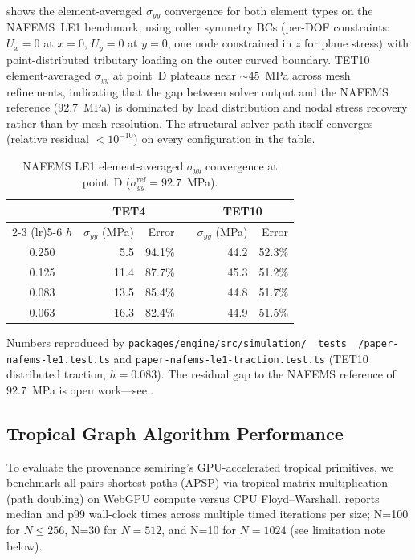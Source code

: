 \documentclass[journal]{IEEEtran}
\begin{document}
 shows the element-averaged $\sigma_{yy}$ convergence
for both element types on the NAFEMS~LE1 benchmark, using roller symmetry
BCs (per-DOF constraints: $U_x = 0$ at $x = 0$, $U_y = 0$ at $y = 0$,
one node constrained in $z$ for plane stress) with point-distributed
tributary loading on the outer curved boundary. TET10 element-averaged
$\sigma_{yy}$ at point~D plateaus near $\sim 45$~MPa across mesh
refinements, indicating that the gap between solver output and the
NAFEMS reference (92.7~MPa) is dominated by load distribution and
nodal stress recovery rather than by mesh resolution. The structural
solver path itself converges (relative residual $< 10^{-10}$) on every
configuration in the table.

\begin{table}[t]
  \centering
  \caption{NAFEMS LE1 element-averaged $\sigma_{yy}$ convergence at
    point~D ($\sigma_{yy}^{\text{ref}} = 92.7$~MPa).}
  \label{tab:nafems-conv}
  \begin{tabular}{@{}crrcrr@{}}
    \toprule
    & \multicolumn{2}{c}{TET4} & & \multicolumn{2}{c}{TET10} \\
    \cmidrule(lr){2-3} \cmidrule(lr){5-6}
    $h$ & $\sigma_{yy}$ (MPa) & Error & & $\sigma_{yy}$ (MPa) & Error \\
    \midrule
    0.250  & 5.5  & 94.1\% & & 44.2  & 52.3\% \\
    0.125  & 11.4 & 87.7\% & & 45.3  & 51.2\% \\
    0.083  & 13.5 & 85.4\% & & 44.8  & 51.7\% \\
    0.063  & 16.3 & 82.4\% & & 44.9  & 51.5\% \\
    \bottomrule
  \end{tabular}
  \vspace{2pt}
  {\footnotesize Numbers reproduced by
    \texttt{packages/engine/src/simulation/\_\_tests\_\_/paper-nafems-le1.test.ts}
    and \texttt{paper-nafems-le1-traction.test.ts} (TET10 distributed
    traction, $h = 0.083$). The residual gap to the NAFEMS reference
    of $92.7$~MPa is open work---see
    .}
\end{table}

\subsection{Tropical Graph Algorithm Performance}

To evaluate the provenance semiring's GPU-accelerated tropical primitives,
we benchmark all-pairs shortest paths (APSP) via tropical matrix
multiplication (path doubling) on WebGPU compute versus CPU
Floyd--Warshall.  reports median and p99 wall-clock
times across multiple timed iterations per size; N=100 for $N \leq 256$,
N=30 for $N=512$, and N=10 for $N=1024$ (see limitation note below).
\end{document}
